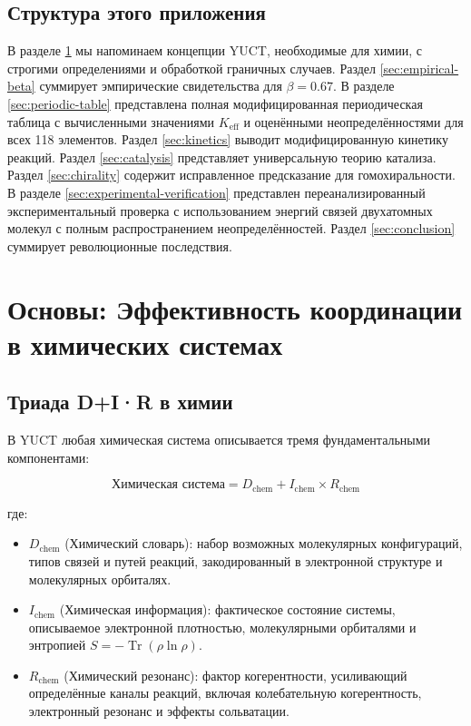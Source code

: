 \documentclass[12pt,a4paper]{article}
\theoremstyle{remark}
\newcommand{\Keff}{K_{\mathrm{eff}}}
\DeclareMathOperator{\Tr}{Tr}
\begin{document}
	\subsection{Структура этого приложения}
	
	В разделе \ref{sec:foundations} мы напоминаем концепции YUCT, необходимые для химии, с строгими определениями и обработкой граничных случаев. Раздел \ref{sec:empirical-beta} суммирует эмпирические свидетельства для $\beta = 0.67$. В разделе \ref{sec:periodic-table} представлена полная модифицированная периодическая таблица с вычисленными значениями $\Keff$ и оценёнными неопределённостями для всех 118 элементов. Раздел \ref{sec:kinetics} выводит модифицированную кинетику реакций. Раздел \ref{sec:catalysis} представляет универсальную теорию катализа. Раздел \ref{sec:chirality} содержит исправленное предсказание для гомохиральности. В разделе \ref{sec:experimental-verification} представлен переанализированный экспериментальный проверка с использованием энергий связей двухатомных молекул с полным распространением неопределённостей. Раздел \ref{sec:conclusion} суммирует революционные последствия.
	
	\section{Основы: Эффективность координации в химических системах}
	\label{sec:foundations}
	
	\subsection{Триада D+I·R в химии}
	
	В YUCT любая химическая система описывается тремя фундаментальными компонентами:
	
	\begin{equation}
		\text{Химическая система} = D_{\text{chem}} + I_{\text{chem}} \times R_{\text{chem}}
		\label{eq:chem-triad}
	\end{equation}
	
	где:
	\begin{itemize}
		\item $D_{\text{chem}}$ (Химический словарь): набор возможных молекулярных конфигураций, типов связей и путей реакций, закодированный в электронной структуре и молекулярных орбиталях.
		\item $I_{\text{chem}}$ (Химическая информация): фактическое состояние системы, описываемое электронной плотностью, молекулярными орбиталями и энтропией $S = -\Tr(\rho \ln \rho)$.
		\item $R_{\text{chem}}$ (Химический резонанс): фактор когерентности, усиливающий определённые каналы реакций, включая колебательную когерентность, электронный резонанс и эффекты сольватации.
	\end{itemize}
	
\end{document}
